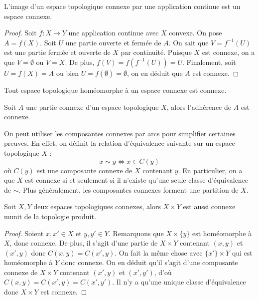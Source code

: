 \documentclass[a4paper]{article}
\begin{document}
\begin{proposition} L'image d'un espace topologique connexe par une application continue est un espace connexe.
\end{proposition}
\begin{proof}
Soit \(f: X\to Y\) une application continue avec \(X\) convexe. On pose \(A = f(X)\). Soit \(U\) une partie ouverte et fermée de \(A\). 
On sait que \(V = f^{-1}(U)\) est une partie fermée et ouverte de \(X\) par continuité.
Puisque \(X\) est connexe, on a que \(V = \emptyset\) ou \(V = X\). De plus, \(f(V) =f(f^{-1}(U)) = U\).
Finalement, soit \(U = f(X) = A\) ou bien \(U = f(\emptyset) = \emptyset\), on en déduit que \(A\) est connexe. 
\end{proof}
\begin{corollary} Tout espace topologique homéomorphe à un espace connexe est connexe.
\end{corollary}
\begin{proposition} Soit \(A\) une partie connexe d'un espace topologique \(X\), alors l'adhérence de \(A\) est connexe.
\end{proposition}
On peut utiliser les composantes connexes par arcs pour simplifier certaines preuves.
En effet, on définit la relation d'équivalence suivante sur un espace topologique \(X\) :
\begin{equation}
    x\sim y \iff x\in C(y)
\end{equation}
où \(C(y)\) est une composante connexe de \(X\) contenant \(y\). En particulier, 
on a que \(X\) est connexe si et seulement si il n'existe qu'une seule classe d'équivalence de \(\sim\).
Plus généralement, les composantes connexes forment une partition de \(X\).
\begin{proposition}
    Soit \(X,Y\) deux espaces topologiques connexes, alors \(X\times Y\) est aussi connexe munit de la topologie produit.
\end{proposition}
\begin{proof} Soient \(x,x'\in X\) et \(y,y'\in Y\). Remarquons que \(X\times \{y\}\) est homéomorphe à \(X\), donc connexe.
    De plus, il s'agit d'une partie de \(X\times Y\) contenant \((x,y)\) et \((x',y)\) donc
    \(C(x,y) = C(x',y)\). On fait la même chose avec \(\{x'\}\times Y\) qui est homéomorphe à \(Y\) donc connexe.
    On en déduit qu'il s'agit d'une composante connexe de \(X\times Y\) contenant \((x',y)\) et \((x',y')\), 
    d'où \(C(x,y) = C(x',y) = C(x',y')\). Il n'y a qu'une unique classe d'équivalence donc \(X\times Y\) est connexe.
\end{proof}
\end{document}
